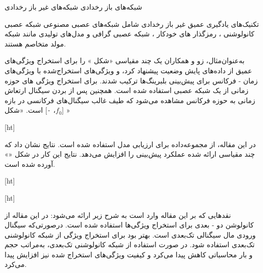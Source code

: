 
 شبکه‌های باز رخدادی
 شبکه‌های غیر باز رخدادی


تکنیک‌های یادگیری عمیق غیر باز رخدادی شامل شبکه‌های عصبی مصنوعی 
شبکه عصبی کانولوشنی ، رمزگذار های خودکار ، شبکه عصبی گرافی  و مدل‌های تولیدی مانند شبکه مولد متخاصم  هستند.


به‌عنوان‌مثال، زو و همکاران  یک  چند مقیاسی «شکل » را برای استخراج ویژگی‌های عمیق از داده‌های پایش وضعیت پیشنهاد کرد، و ویژگی‌های استخراج‌شده با ویژگی‌های زمان - فرکانس برای پیش‌بینی  بلبرینگ‌ها ترکیب شدند. برای استخراج ویژگی های حوزه زمانی از یک شبکه عصبی  استفاده شده است. همچنین پس از بردن سیگنال ارتعاش زمانی به حوزه فرکانس مشاهده می‌شود که طیف غالب سیگنال‌های فرکانسی در بازه [$f_0$، ۰] است. «شکل »





[ht]






در این مقاله، از مجموعه‌داده  برای ارزیابی مدل استفاده شده است. نتایج نشان داد که  چند مقیاسی ارائه شده عملکرد پیش‌بینی را افزایش می‌دهد. نتایج این کار در شکل «» آورده شده است.


[ht]




[ht]

نقد‌هایی که بر این مقاله وارد است به شرح زیر ارائه می‌شود:
 در این مقاله از کانولوشن دو - بعدی برای استخراج ویژگی‌ها استفاده شده است. درصورتی‌که سیگنال ورودی مال سیگنالی تک‌بعدی است. بهتر بود برای استخراج ویژگی از شبکه کانولوشنی تک‌بعدی استفاده شود. در صورت استفاده از شبکه کانولوشنی تک‌بعدی، به‌مراتب حجم و بار محاسباتی کاهش پیدا می‌کرد و کیفیت ویژگی‌های استخراج شده نیز افزایش پیدا می‌کرد.

